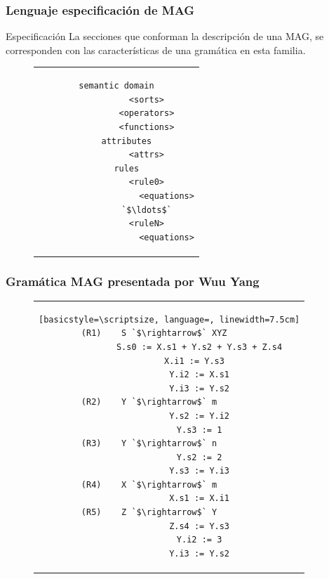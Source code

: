 \documentclass[10pt]{beamer}
\begin{document}
\begin{frame}[fragile]
    \frametitle{Lenguaje especificación de MAG}

    \begin{block}{Especificación}
    La secciones que conforman la descripción de una MAG, se corresponden con las características de una gramática en esta familia.
    \end{block}
    
\begin{figure}[h]
\begin{center}
\begin{tabular}{c}
 \begin{lstlisting}[language=specmag, basicstyle=\small, linewidth=7cm]
    semantic domain
            <sorts>
            <operators>
            <functions>
    attributes
            <attrs>
    rules
            <rule0>
                    <equations>
            `$\ldots$`
            <ruleN>
                    <equations>
\end{lstlisting} 
\end{tabular}
\end{center}
\end{figure}
\end{frame}

\begin{frame}[fragile]
\frametitle{Gramática MAG presentada por Wuu Yang}

\begin{figure}[h]
\begin{center}
\begin{tabular}{c}
\begin{lstlisting}[basicstyle=\scriptsize, language=, linewidth=7.5cm]
(R1)    S `$\rightarrow$` XYZ      
            S.s0 := X.s1 + Y.s2 + Y.s3 + Z.s4
            X.i1 := Y.s3  
            Y.i2 := X.s1
            Y.i3 := Y.s2
(R2)    Y `$\rightarrow$` m        
            Y.s2 := Y.i2
            Y.s3 := 1
(R3)    Y `$\rightarrow$` n        
            Y.s2 := 2
            Y.s3 := Y.i3
(R4)    X `$\rightarrow$` m        
            X.s1 := X.i1
(R5)    Z `$\rightarrow$` Y        
            Z.s4 := Y.s3
            Y.i2 := 3
            Y.i3 := Y.s2
\end{lstlisting} 
\end{tabular}
\end{center}
\end{figure}
\end{frame}
\end{document}
